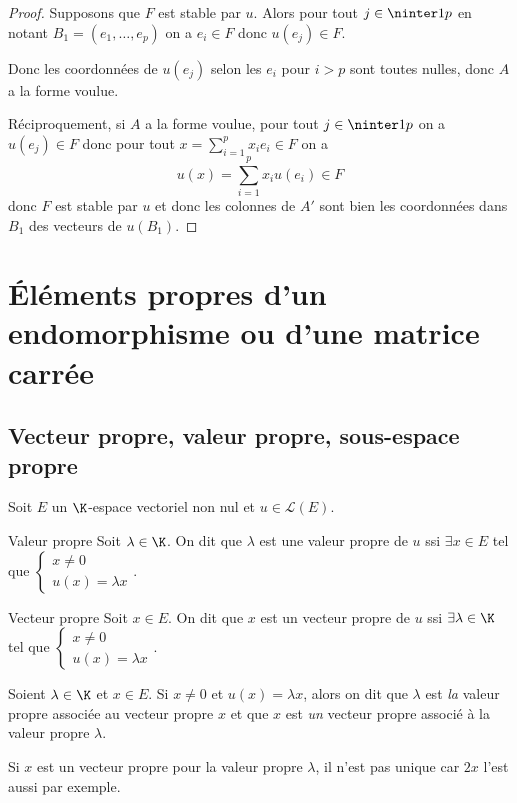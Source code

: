 \begin{proof}
    Supposons que $F$ est stable par $u$. Alors pour tout $j \in \ninter 1 p $ en notant 
    $B_1 = (e_1, \ldots, e_p)$ on a $e_i \in F$ donc $u(e_j) \in F$. 

    Donc les coordonnées de $u(e_j)$ selon les $e_i$ pour $i > p$ sont toutes nulles, donc 
    $A$ a la forme voulue.

    \lvspace Réciproquement, si $A$ a la forme voulue, pour tout $j \in \ninter 1 p$ on a
    $u(e_j) \in F$ donc pour tout $x = \sum_{i = 1}^p x_i e_i \in F$ on a
    \[
        u(x) = \sum_{i = 1}^p x_i u(e_i) \in F
    \]
    donc $F$ est stable par $u$ et donc les colonnes de $A'$ sont bien les coordonnées dans $B_1$ 
    des vecteurs de $u(B_1)$.
\end{proof}


\section{\'Eléments propres d'un endomorphisme ou d'une matrice carrée }
\subsection{Vecteur propre, valeur propre, sous-espace propre }

Soit $E$ un $\K$-espace vectoriel non nul et $u \in \mathscr L(E)$.

\begin{definition}{Valeur propre}{}
    Soit $\lambda \in \K$. On dit que $\lambda$ est une valeur propre de $u$ ssi
    $\exists x \in E$ tel que $\begin{cases} x \neq 0 \\ u(x) = \lambda x \end{cases}$.
\end{definition}

\begin{definition}{Vecteur propre}{}
    Soit $x \in E$. On dit que $x$ est un vecteur propre de $u$ ssi
    $\exists \lambda \in \K$ tel que $\begin{cases} x \neq 0 \\ u(x) = \lambda x \end{cases}$.
\end{definition}

\begin{remarque}
    Soient $\lambda \in \K$ et $x \in E$. Si $x \neq 0$ et $u(x) = \lambda x$, alors 
    on dit que $\lambda$ est \emph{la} valeur propre associée au vecteur propre $x$ et 
    que $x$ est \emph{un} vecteur propre associé à la valeur propre $\lambda$.

    Si $x$ est un vecteur propre pour la valeur propre $\lambda$, il n'est pas unique 
    car $2x$ l'est aussi par exemple.
\end{remarque}

